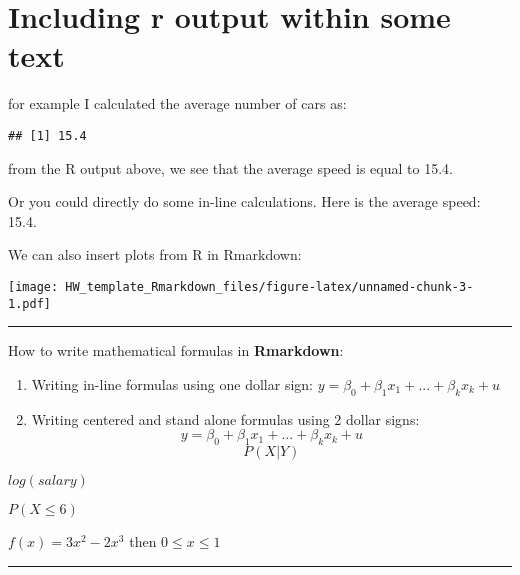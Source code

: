\documentclass[
]{article}
\newenvironment{Shaded}{\begin{snugshade}}{\end{snugshade}}
\newcommand{\AttributeTok}[1]{\textcolor[rgb]{0.77,0.63,0.00}{#1}}
\newcommand{\FunctionTok}[1]{\textcolor[rgb]{0.00,0.00,0.00}{#1}}
\newcommand{\NormalTok}[1]{#1}
\newcommand{\OtherTok}[1]{\textcolor[rgb]{0.56,0.35,0.01}{#1}}
\newcommand{\SpecialCharTok}[1]{\textcolor[rgb]{0.00,0.00,0.00}{#1}}
\newcommand{\StringTok}[1]{\textcolor[rgb]{0.31,0.60,0.02}{#1}}
\begin{document}
\hypertarget{including-r-output-within-some-text}{%
\section{Including r output within some
text}\label{including-r-output-within-some-text}}

for example I calculated the average number of cars as:

\begin{Shaded}
\end{Shaded}

\begin{verbatim}
## [1] 15.4
\end{verbatim}

from the R output above, we see that the average speed is equal to 15.4.

Or you could directly do some in-line calculations. Here is the average
speed: 15.4.

We can also insert plots from R in Rmarkdown:

\begin{Shaded}
\end{Shaded}

\texttt{[image: HW\_template\_Rmarkdown\_files/figure-latex/unnamed-chunk-3-1.pdf]}

\begin{center}\rule{0.5\linewidth}{0.5pt}\end{center}

How to write mathematical formulas in \textbf{Rmarkdown}:

\begin{enumerate}
\def\labelenumi{\arabic{enumi}.}
\item
  Writing in-line formulas using one dollar sign:
  \(y=\beta_0 + \beta_1 x_1 + ... + \beta_k x_k + u\)
\item
  Writing centered and stand alone formulas using 2 dollar signs:
  \[y=\beta_0 + \beta_1 x_1 + ... + \beta_k x_k + u\] \[P(X|Y)\]
\end{enumerate}

\(log(salary)\)

\(P(X \le 6)\)

\(f(x)=3x^2 -2x^3\) then \(0 \le x \le 1\)

\begin{center}\rule{0.5\linewidth}{0.5pt}\end{center}
\end{document}
